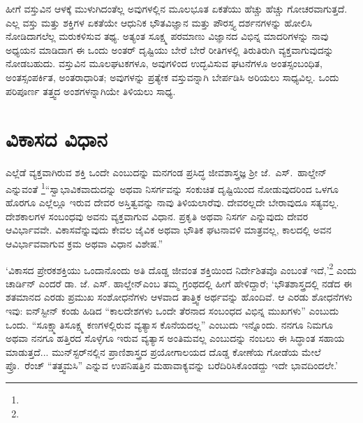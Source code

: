 ಹೀಗೆ ವಸ್ತುವಿನ ಆಳಕ್ಕೆ ಮುಳುಗಿದಂತೆಲ್ಲ ಅವುಗಳಲ್ಲಿನ ಮೂಲಭೂತ ಏಕತೆಯು ಹೆಚ್ಚು ಹೆಚ್ಚು ಗೋಚರವಾಗುತ್ತದೆ. ಎಲ್ಲ ವಸ್ತು ಮತ್ತು ಶಕ್ತಿಗಳ ಏಕತೆಯೇ ಆಧುನಿಕ ಭೌತವಿಜ್ಞಾನ ಮತ್ತು ಪೌರಸ್ತ್ಯ ದರ್ಶನಗಳನ್ನು ಹೋಲಿಸಿ ನೋಡಿದಾಗಲೆಲ್ಲ ಮರುಕಳಿಸುವ ತಥ್ಯ. ಅತ್ಯಂತ ಸೂಕ್ಷ್ಮ ಪರಮಾಣು ವಿಜ್ಞಾನದ ವಿಭಿನ್ನ ಮಾದರಿಗಳನ್ನು ನಾವು ಅಧ್ಯಯನ ಮಾಡಿದಾಗ ಈ ಒಂದು ಅಂತರ್ ದೃಷ್ಟಿಯು ಬೇರೆ ಬೇರೆ ರೀತಿಗಳಲ್ಲಿ ತಿರುತಿರುಗಿ ವ್ಯಕ್ತವಾಗುವುದನ್ನು ನೋಡಬಹುದು. ವಸ್ತುವಿನ ಮೂಲಘಟಕಗಳೂ, ಅವುಗಳಿಂದ ಉದ್ಭವಿಸುವ ಘಟನೆಗಳೂ ಅಂತಸ್ಸಂಬಂಧಿತ, ಅಂತ\-ಸ್ಸಂಪರ್ಕಿತ, ಅಂತರಾಧಾರಿತ; ಅವುಗಳನ್ನು ಪ್ರತ್ಯೇಕ ವಸ್ತುವನ್ನಾಗಿ ಬೇರ್ಪಡಿಸಿ ಅರಿಯಲು ಸಾಧ್ಯವಿಲ್ಲ. ಒಂದು ಪರಿಪೂರ್ಣ ತತ್ತ್ವದ ಅಂಶಗಳನ್ನಾಗಿಯೇ ತಿಳಿಯಲು ಸಾಧ್ಯ.


\section*{ವಿಕಾಸದ ವಿಧಾನ}


ಎಲ್ಲೆಡೆ ವ್ಯಕ್ತವಾಗಿರುವ ಶಕ್ತಿ ಒಂದೇ ಎಂಬುದನ್ನು ಮನಗಂಡ ಪ್ರಸಿದ್ಧ ಜೀವಶಾಸ್ತ್ರಜ್ಞ ಶ‍್ರೀ ಜೆ.\ ಎಸ್.\ ಹಾಲ್ಡೇನ್​ ಎನ್ನುವಂತೆ \footnote{\hfill{}}“ಸ್ವಾಭಾವಿಕವಾದುದನ್ನು ಅಥವಾ ನಿಸರ್ಗವನ್ನು ಸಂಕುಚಿತ ದೃಷ್ಟಿಯಿಂದ ನೋಡುವುದರಿಂದ ಒಳಗೂ ಹೊರಗೂ ಎಲ್ಲೆಲ್ಲೂ ಇರುವ ದೇವರ ಅಸ್ತಿತ್ವವನ್ನು ನಾವು ತಿಳಿಯಲಾರೆವು. ದೇವರಲ್ಲದೇ ಬೇರಾವುದೂ ಸತ್ಯವಲ್ಲ. ದೇಶಕಾಲಗಳ ಸಂಬಂಧವು ಅವನು ವ್ಯಕ್ತವಾಗುವ ವಿಧಾನ. ಪ್ರಕೃತಿ ಅಥವಾ ನಿಸರ್ಗ ಎನ್ನುವುದು ದೇವರ ಆವಿರ್ಭಾವವೇ. ವಿಕಾಸವೆನ್ನುವುದು ಕೇವಲ ಜೈವಿಕ ಅಥವಾ ಭೌತಿಕ ಘಟನಾವಳಿ ಮಾತ್ರವಲ್ಲ, ಕಾಲದಲ್ಲಿ ಅವನ ಆವಿರ್ಭಾವವಾಗುವ ಕ್ರಮ ಅಥವಾ ವಿಧಾನ ವಿಶೇಷ.”

\newpage

‘ವಿಕಾಸದ ಪ್ರೇರಕಶಕ್ತಿಯು ಒಂದಾನೊಂದು ಅತಿ ದೊಡ್ಡ ಜೀವಂತ ಶಕ್ತಿಯಿಂದ ನಿರ್ದೇಶಿತವೊ ಎಂಬಂತೆ ಇದೆ,’\footnote{\hfill\hbox{}} ಎಂದು ಚಾರ್ಡಿನ್ ಎಂದರೆ ಡಾ. ಜೆ. ಎಸ್. ಹಾಲ್ಡೇನ್​ ಎಂಬ ತಮ್ಮ ಗ್ರಂಥದಲ್ಲಿ ಹೀಗೆ ಹೇಳಿದ್ದಾರೆ; ‘ಭೌತಶಾಸ್ತ್ರದಲ್ಲಿ ನಡೆದ ಈ ಶತಮಾನದ ಎರಡು ಪ್ರಮುಖ ಸಂಶೋಧನೆಗಳು ಆಳವಾದ ತಾತ್ತ್ವಿಕ ಅರ್ಥವನ್ನು ಹೊಂದಿವೆ. ಆ ಎರಡು ಶೋಧನೆಗಳು ಇವು: ಐನ್​ಸ್ಟೀನ್ ಕಂಡು ಹಿಡಿದ “ಕಾಲದೇಶಗಳು ಒಂದೇ ತೆರನಾದ ಸಂಬಂಧದ ವಿಭಿನ್ನ ಮುಖಗಳು” ಎಂಬುದು ಒಂದು. “ಸೂಕ್ಷ್ಮಾತಿಸೂಕ್ಷ್ಮ ಕಣಗಳಲ್ಲಿರುವ ವ್ಯತ್ಯಾಸ ಕೊನೆಯದಲ್ಲ” ಎಂಬುದು ಇನ್ನೊಂದು. ನನಗೂ ನಿಮಗೂ ಅಥವಾ ನನಗೂ ಹತ್ತಿರದ ಸೊಳ್ಳೆಗೂ ಇರುವ ವ್ಯತ್ಯಾಸ ಅಂತಿಮವಲ್ಲ ಎಂಬುದನ್ನು ನಂಬಲು ಈ ಸಿದ್ಧಾಂತ ಸಹಾಯ ಮಾಡುತ್ತದೆ... ಮುನ್​ಸ್ಟರ್​ನಲ್ಲಿನ ಪ್ರಾಣಿಶಾಸ್ತ್ರದ ಪ್ರಯೋಗಾಲಯದ ದೊಡ್ಡ ಕೋಣೆಯ ಗೋಡೆಯ ಮೇಲೆ ಪ್ರೊ.\ ರೆಂಚ್ “ತತ್ತ್ವಮಸಿ” ಎನ್ನುವ ಉಪನಿಷತ್ತಿನ ಮಹಾವಾಕ್ಯವನ್ನು ಬರೆದಿರಿಸಿಕೊಂಡದ್ದು ಇದೇ ಭಾವದಿಂದಲೇ.’

